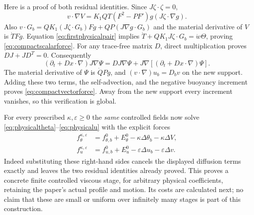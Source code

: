 Here is a proof of both residual identities. Since $J\zeta\cdot\zeta=0$,
\[
 v\cdot\nabla V=K_1QT(F^2-PF')g(J\zeta\cdot\nabla g).
\]
Also $v\cdot G_b=QK_1(J\zeta\cdot G_b)Fg+
 QP(J\nabla g\cdot G_b)$ and the material derivative of $V$ is
$\dot T Fg$. Equation \eqref{eq:firstphysicalpair} implies
$\dot T+QK_1J\zeta\cdot G_b=\dot w\Theta$, proving
\eqref{eq:compactscalarforce}. For any trace-free matrix $D$,
direct multiplication proves $DJ+JD^T=0$. Consequently
\[
 (\partial_t+Dx\cdot\nabla)J\nabla\Psi
 =D J\nabla\Psi+J\nabla[(\partial_t+Dx\cdot\nabla)\Psi].
\]
The material derivative of $\Psi$ is $\dot QPg$, and
$(v\cdot\nabla)u_b=D_bv$ on the new support. Adding these two
terms, the self-advection, and the negative buoyancy increment
proves \eqref{eq:compactvectorforce}. Away from the new support
every increment vanishes, so this verification is global.

For every prescribed $\kappa,\varepsilon\geq0$ the \emph{same}
controlled fields now solve \eqref{eq:physicaltheta}--\eqref{eq:physicalu}
with the explicit forces
\begin{align}
 f_\theta^{\kappa,\varepsilon}
 &=f^0_{\theta,b}+E^0_\theta-\kappa\Delta\theta_b-\kappa\Delta V,
 \label{eq:exactviscforce}\\
 f_u^{\kappa,\varepsilon}
 &=f^0_{u,b}+E^0_u-\varepsilon\Delta u_b-\varepsilon\Delta v.
 \label{eq:exactviscu}
\end{align}
Indeed substituting these right-hand sides cancels the displayed
diffusion terms exactly and leaves the two residual identities
already proved. This proves a concrete finite controlled viscous
stage, for arbitrary physical coefficients, retaining the paper's
actual profile and motion. Its costs are calculated next; no
claim that these are small or uniform over infinitely many stages
is part of this construction.

